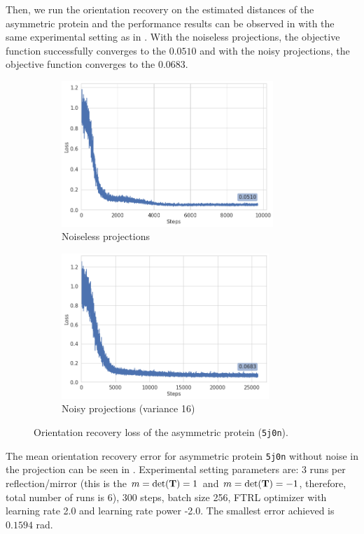 Then, we run the orientation recovery on the estimated distances of the asymmetric protein and the performance results can be observed in  with the same experimental setting as in .
With the noiseless projections, the objective function successfully converges to the $0.0510$ and with the noisy projections, the objective function converges to the $0.0683$. 


\begin{figure}[ht!]
    \centering
    \begin{subfigure}[b]{0.45\textwidth}
        \includegraphics[height=5.5cm]{images/5j0n_noise0_angle_recovery.png}
        \caption{Noiseless projections}
    \end{subfigure}
    \hfill
    \begin{subfigure}[b]{0.5\textwidth}
    \centering
        \includegraphics[height=5.5cm]{images/5j0n_noise16_angle_recovery.png}
        \caption{Noisy projections (variance 16)}
    \end{subfigure}
    \caption{ Orientation recovery loss of the asymmetric protein (\texttt{5j0n}).}
    \label{fig:5j0n-orientation-recovery-loss-est}
\end{figure}

The mean orientation recovery error for asymmetric protein \texttt{5j0n} without noise in the projection can be seen in .
Experimental setting parameters are: 3 runs per reflection/mirror (this is the $m=\det(\mathbf{T})=1$ and $m=\det(\mathbf{T})=-1$, therefore, total number of runs is 6), 300 steps, batch size 256, FTRL optimizer with learning rate 2.0 and learning rate power -2.0.
The smallest error achieved is $0.1594$ rad. 

